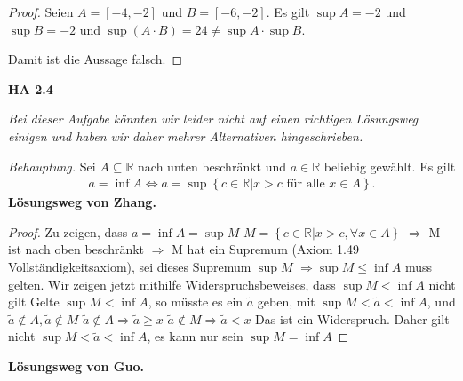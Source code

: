\documentclass[12pt]{extarticle}
\begin{document}
\vspace{4mm}

  \begin{proof}
  Seien \(A = [-4,-2]\) und \(B=[-6,-2]\).  Es gilt \(\sup A = -2\) und
  \(\sup B = -2\) und \(\sup (A \cdot B)=24 \neq \sup A \cdot \sup B\).

  Damit ist die Aussage falsch.
  \end{proof}

  \textbf{HA 2.4}
\begin{center}
\textit{  Bei dieser Aufgabe könnten wir leider nicht auf einen richtigen
  Lösungsweg einigen und haben wir daher mehrer Alternativen
  hingeschrieben.}
\end{center}

  \textit{Behauptung.}  Sei \(A \subseteq \mathbb{R}\) nach unten
  beschränkt und \(a \in \mathbb{R}\) beliebig gewählt.
  Es gilt
\begin{align*}
  a = \inf A \iff a = \sup \left\{ c \in \mathbb{R} | x > c
       \text{ für alle } x \in A \right\}.
\end{align*}
      \textbf{Lösungsweg von Zhang.}
\begin{proof}
  Zu zeigen, dass \(a = \inf A = \sup M \)
  \(M = \left\{ c \in \mathbb{R} | x > c, \forall x \in A \right\}\) \(\Rightarrow\) M ist nach oben beschränkt \(\Rightarrow\) M hat ein Supremum (Axiom 1.49 Vollständigkeitsaxiom), sei dieses Supremum \(\sup M\)
  \(\Rightarrow \sup M \leq \inf A\) muss gelten. Wir zeigen jetzt mithilfe Widerspruchsbeweises, dass \(\sup M < \inf A\) nicht gilt
  Gelte \(\sup M < \inf A\), so müsste es ein \(\tilde{a}\) geben, mit \(\sup M < \tilde{a} < \inf A\), und \( \tilde{a} \notin A, \tilde{a} \notin M \)
  \(\tilde{a} \notin A \Rightarrow \tilde{a} \geq x\)
  \(\tilde{a} \notin M \Rightarrow \tilde{a} < x\)
  Das ist ein Widerspruch. Daher gilt nicht
  \(\sup M < \tilde{a} < \inf A\), es kann nur sein \(\sup M = \inf A\)


  \end{proof}
      \textbf{Lösungsweg von Guo.}
\end{document}
